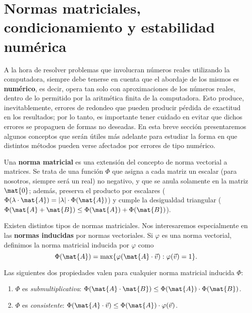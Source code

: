 
\section{Normas matriciales, condicionamiento y estabilidad numérica}
\label{section:estabilidad}

A la hora de resolver problemas que involucran números reales utilizando la
computadora, siempre debe tenerse en cuenta que el abordaje de los mismos es
\textbf{numérico}, es decir, opera tan solo con aproximaciones de los números
reales, dentro de lo permitido por la aritmética finita de la computadora.
Esto produce, inevitablemente, errores de redondeo que pueden producir pérdida
de exactitud en los resultados; por lo tanto, es importante tener cuidado en
evitar que dichos errores se propaguen de formas no deseadas.
En esta breve sección presentaremos algunos conceptos que serán útiles más
adelante para estudiar la forma en que distintos métodos pueden verse
afectados por errores de tipo numérico.

Una \textbf{norma matricial} es una extensión del concepto de norma vectorial
a matrices. Se trata de una función $\Phi$ que asigna a cada matriz un escalar
(para nosotros, siempre será un real) no negativo, y que se anula solamente en
la matriz $\mat{0}$; además, preserva el producto por escalares ($\Phi(
\lambda \cdot \mat{A}) = \lvert \lambda \rvert \cdot \Phi(\mat{A})$) y cumple
la desigualdad triangular ($\Phi(\mat{A} + \mat{B}) \leq \Phi(\mat{A}) +
\Phi(\mat{B})$).

Existen distintos tipos de normas matriciales. Nos interesaremos especialmente
en las \textbf{normas inducidas} por normas vectoriales. Si $\varphi$ es una
norma vectorial, definimos la norma matricial inducida por $\varphi$ como
\[ \Phi(\mat{A}) =
    \max \{ \varphi(\mat{A} \cdot \vec{v}) : \varphi(\vec{v}) = 1 \}. \]

Las siguientes dos propiedades valen para cualquier norma matricial inducida
$\Phi$:
\begin{enumerate}[label=(\roman*)]
\item $\Phi$ es \emph{submultiplicativa}: $\Phi(\mat{A} \cdot \mat{B}) \leq
    \Phi({\mat{A}}) \cdot \Phi(\mat{B})$.
\item $\Phi$ es \emph{consistente}: $\Phi(\mat{A} \cdot \vec{v}) \leq
    \Phi(\mat{A}) \cdot \varphi(\vec{v})$.
\end{enumerate}

